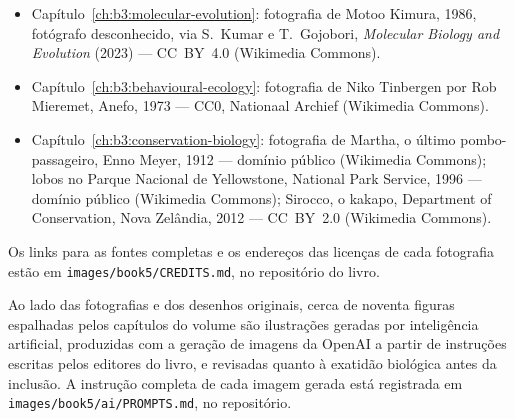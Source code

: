 \begin{itemize}
        Commons).
  \item Capítulo~\ref{ch:b3:molecular-evolution}: fotografia de Motoo
        Kimura, 1986, fotógrafo desconhecido, via S.~Kumar e
        T.~Gojobori, \emph{Molecular Biology and Evolution} (2023) ---
        CC~BY~4.0 (Wikimedia Commons).
  \item Capítulo~\ref{ch:b3:behavioural-ecology}: fotografia de Niko
        Tinbergen por Rob Mieremet, Anefo, 1973 --- CC0, Nationaal
        Archief (Wikimedia Commons).
  \item Capítulo~\ref{ch:b3:conservation-biology}: fotografia de
        Martha, o último pombo-passageiro, Enno Meyer, 1912 --- domínio
        público (Wikimedia Commons); lobos no Parque Nacional de
        Yellowstone, National Park Service, 1996 --- domínio público
        (Wikimedia Commons); Sirocco, o kakapo, Department of
        Conservation, Nova Zelândia, 2012 --- CC~BY~2.0 (Wikimedia
        Commons).
\end{itemize}

Os links para as fontes completas e os endereços das licenças de cada
fotografia estão em
\texttt{images/\allowbreak book5/\allowbreak CREDITS.md}, no repositório do livro.

\bigskip
Ao lado das fotografias e dos desenhos originais, cerca de noventa
figuras espalhadas pelos capítulos do volume são ilustrações geradas
por inteligência artificial, produzidas com a geração de imagens da
OpenAI a partir de instruções escritas pelos editores do livro, e
revisadas quanto à exatidão biológica antes da inclusão. A instrução
completa de cada imagem gerada está registrada em
\texttt{images/\allowbreak book5/\allowbreak ai/\allowbreak PROMPTS.md}, no repositório.
\par\endgroup
\clearpage
